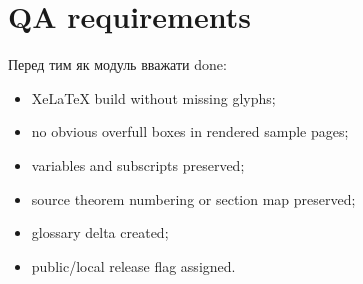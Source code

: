 \section*{QA requirements}

Перед тим як модуль вважати done:
\begin{itemize}[leftmargin=2em]
\item XeLaTeX build without missing glyphs;
\item no obvious overfull boxes in rendered sample pages;
\item variables and subscripts preserved;
\item source theorem numbering or section map preserved;
\item glossary delta created;
\item public/local release flag assigned.
\end{itemize}
